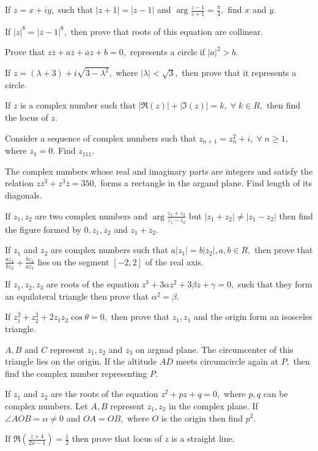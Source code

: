 \item If $z = x + iy,$ such that $|z + 1| = |z - 1|$ and $\arg\frac{z - 1}{z + 1} = \frac{\pi}{4},$ find $x$ and $y$.
\item If $|z|^8 = |z - 1|^8,$ then prove that roots of this equation are collinear.
\item Prove that $z\overline{z} + a\overline{z} + \overline{a}z + b = 0,$ represents a circle if $|a|^2 > b$.
\item If $z = (\lambda + 3) + i\sqrt{3 - \lambda^2},$ where $|\lambda| < \sqrt{3},$ then prove that it represents a circle.
\item If $z$ is a complex number such that $|\Re(z)| + |\Im(z)| = k,\;\forall\; k\in R,$ then find the locus of $z$.
\item Consider a sequence of complex numbers such that $z_{n + 1} = z_n^2 + i,\;\forall\;n\geq 1,$ where $z_1 = 0.$ Find $z_{111}$.
\item The complex numbers whose real and imaginary parts are integers and satisfy the relation $z\overline{z}^3 +
  z^3\overline{z} = 350,$ forms a rectangle in the argand plane. Find length of its diagonals.
\item If $z_1, z_2$ are two complex numbers and $\arg\frac{z_1 + z_2}{z_1 - z_2}$ but $|z_1 + z_2|\neq |z_1 - z_2|$ then
  find the figure formed by $0, z_1, z_2$ and $z_1 + z_2.$
\item If $z_1$ and $z_2$ are complex numbers such that $a|z_1| = b|z_2|, a, b\in R,$ then prove that $\frac{az_1}{bz_2} +
  \frac{bz_2}{az_1}$ lies on the segment $[-2, 2]$ of the real axis.
\item If $z_1, z_2, z_3$ are roots of the equation $z^3 + 3\alpha z^2 + 3\beta z + \gamma = 0,$ such that they form an
  equilateral triangle then prove that $\alpha^2 = \beta$.
\item If $z_1^2 + z_2^2 + 2z_1z_2\cos\theta = 0,$ then prove that $z_1, z_1$ and the origin form an isosceles triangle.
\item $A, B$ and $C$ represent $z_1, z_2$ and $z_3$ on argnad plane. The circumcenter of this triangle lies on the
  origin. If the altitude $AD$ meets circumcircle again at $P,$ then find the complex number representing $P$.
\item If $z_1$ and $z_2$ are the roots of the equation $z^2 + pz + q = 0,$ where $p,q$ can be complex numbers. Let $A, B$
  represent $z_1, z_2$ in the complex plane. If $\angle AOB = \alpha \neq 0$ and $OA = OB,$ where $O$ is the origin then find
  $p^2$.
\item If $\Re\left(\frac{z + 4}{2x - 1}\right) = \frac{1}{2}$ then prove that locus of $z$ is a straight line.
